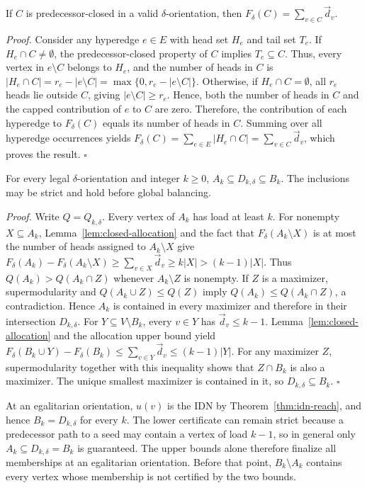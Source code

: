 \documentclass[twocolumn]{svjour3}
\begin{document}
\begin{lemma}
\label{lem:closed-allocation}
If $C$ is predecessor-closed in a valid
$\delta$-orientation, then
$F_\delta(C)=\sum_{v\in C}\vec d_v$.
\end{lemma}
\emph{Proof.}
Consider any hyperedge $e\in E$ with head set $H_e$ and tail set $T_e$. If $H_e\cap C\ne\emptyset$, the predecessor-closed property of $C$ implies $T_e\subseteq C$. Thus, every vertex in $e\setminus C$ belongs to $H_e$, and the number of heads in $C$ is
$|H_e\cap C|=r_e-|e\setminus C|
=\max\{0,r_e-|e\setminus C|\}$.
Otherwise, if $H_e\cap C=\emptyset$, all $r_e$ heads lie outside $C$, giving $|e\setminus C|\ge r_e$. Hence, both the number of heads in $C$ and the capped contribution of $e$ to $C$ are zero.
Therefore, the contribution of each hyperedge to $F_\delta(C)$ equals its number of heads in $C$. Summing over all hyperedge occurrences yields
$F_\delta(C)=\sum_{e\in E}|H_e\cap C|
=\sum_{v\in C}\vec d_v$,
which proves the result.
\hfill$\square$

\begin{theorem}\label{thm:sandwich}
For every legal $\delta$-orientation and integer $k\ge0$,
$A_k\subseteq D_{k,\delta}\subseteq B_k$.
The inclusions may be strict and hold before global balancing.
\end{theorem}
\emph{Proof.} Write $Q=Q_{k,\delta}$. Every vertex of $A_k$ has load at least $k$. For nonempty $X\subseteq A_k$, Lemma~\ref{lem:closed-allocation} and the fact that $F_\delta(A_k\setminus X)$ is at most the number of heads assigned to $A_k\setminus X$ give
$F_\delta(A_k)-F_\delta(A_k\setminus X)
 \ge\sum_{v\in X}\vec d_v\ge k|X|>(k-1)|X|$.
Thus $Q(A_k)>Q(A_k\cap Z)$ whenever $A_k\setminus Z$ is nonempty. If $Z$ is a maximizer, supermodularity and $Q(A_k\cup Z)\le Q(Z)$ imply $Q(A_k)\le Q(A_k\cap Z)$, a contradiction. Hence $A_k$ is contained in every maximizer and therefore in their intersection $D_{k,\delta}$.
For $Y\subseteq V\setminus B_k$, every $v\in Y$ has $\vec d_v\le k-1$. Lemma~\ref{lem:closed-allocation} and the allocation upper bound yield
$F_\delta(B_k\cup Y)-F_\delta(B_k)
 \le\sum_{v\in Y}\vec d_v\le(k-1)|Y|$.
For any maximizer $Z$, supermodularity together with this inequality shows that $Z\cap B_k$ is also a maximizer. The unique smallest maximizer is contained in it, so $D_{k,\delta}\subseteq B_k$. \hfill$\square$

At an egalitarian orientation, $u(v)$ is the IDN by Theorem~\ref{thm:idn-reach}, and hence $B_k=D_{k,\delta}$ for every $k$. The lower certificate can remain strict because a predecessor path to a seed may contain a vertex of load $k-1$, so in general only $A_k\subseteq D_{k,\delta}=B_k$ is guaranteed. The upper bounds alone therefore finalize all memberships at an egalitarian orientation. Before that point, $B_k\setminus A_k$ contains every vertex whose membership is not certified by the two bounds.
\end{document}
